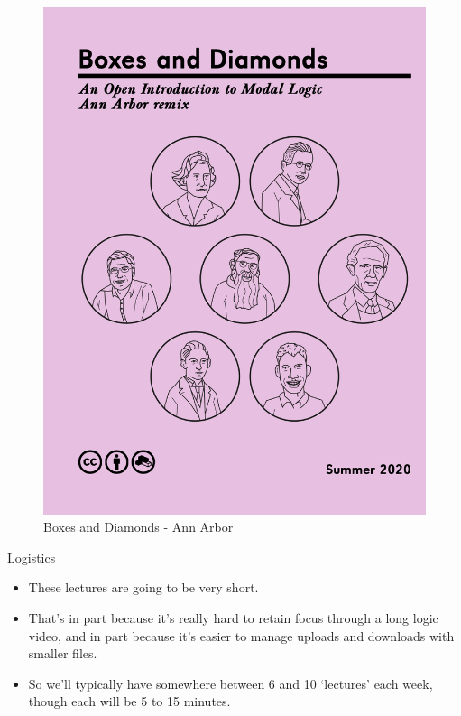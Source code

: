 \documentclass[
  ignorenonframetext,
]{beamer}
\providecommand{\tightlist}{%
  \setlength{\itemsep}{0pt}\setlength{\parskip}{0pt}}
\renewcommand{\,}{\text{, }}
\begin{document}
\begin{frame}

\begin{figure}
\centering
\includegraphics[width=\textwidth,height=0.8\textheight]{../images/0_1_a_Boxes_and_Diamonds_AA.png}
\caption{Boxes and Diamonds - Ann Arbor}
\end{figure}

\end{frame}

\begin{frame}{Logistics}
\protect\hypertarget{logistics}{}

\begin{itemize}
\tightlist
\item
  These lectures are going to be very short.
\item
  That's in part because it's really hard to retain focus through a long
  logic video, and in part because it's easier to manage uploads and
  downloads with smaller files.
\item
  So we'll typically have somewhere between 6 and 10 `lectures' each
  week, though each will be 5 to 15 minutes.
\end{itemize}

\end{frame}
\end{document}

